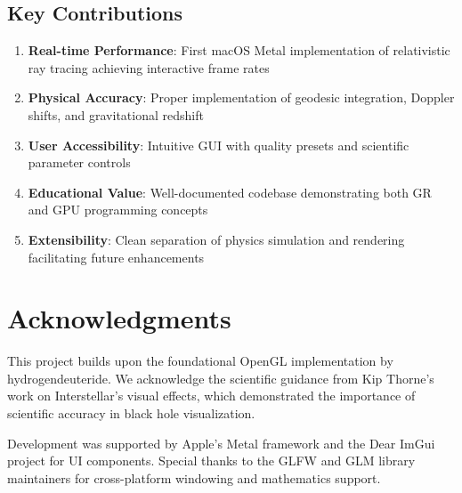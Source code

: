 \documentclass[12pt,a4paper]{article}
\theoremstyle{definition}
\theoremstyle{remark}
\begin{document}
\subsection{Key Contributions}

\begin{enumerate}
    \item \textbf{Real-time Performance}: First macOS Metal implementation of relativistic ray tracing achieving interactive frame rates
    \item \textbf{Physical Accuracy}: Proper implementation of geodesic integration, Doppler shifts, and gravitational redshift
    \item \textbf{User Accessibility}: Intuitive GUI with quality presets and scientific parameter controls
    \item \textbf{Educational Value}: Well-documented codebase demonstrating both GR and GPU programming concepts
    \item \textbf{Extensibility}: Clean separation of physics simulation and rendering facilitating future enhancements
\end{enumerate}

\section*{Acknowledgments}

This project builds upon the foundational OpenGL implementation by hydrogendeuteride. We acknowledge the scientific guidance from Kip Thorne's work on Interstellar's visual effects, which demonstrated the importance of scientific accuracy in black hole visualization.

Development was supported by Apple's Metal framework and the Dear ImGui project for UI components. Special thanks to the GLFW and GLM library maintainers for cross-platform windowing and mathematics support.
\end{document}
